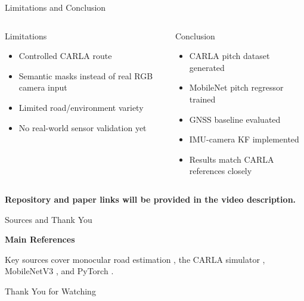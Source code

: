 \documentclass[aspectratio=169,11pt]{beamer}
\begin{document}
\begin{frame}{Limitations and Conclusion}
\begin{columns}[T,onlytextwidth]
\begin{block}{Limitations}
\begin{itemize}
    \item Controlled CARLA route
    \item Semantic masks instead of real RGB camera input
    \item Limited road/environment variety
    \item No real-world sensor validation yet
\end{itemize}
\end{block}

\begin{block}{Conclusion}
\begin{itemize}
    \item CARLA pitch dataset generated
    \item MobileNet pitch regressor trained
    \item GNSS baseline evaluated
    \item IMU-camera KF implemented
    \item Results match CARLA references closely
\end{itemize}
\end{block}
\end{columns}
\vspace{0.5em}
\centering
\textbf{Repository and paper links will be provided in the video description.}
\end{frame}

\begin{frame}{Sources and Thank You}

\scriptsize

\textbf{Main References}

\vspace{0.3cm}

Key sources cover monocular road estimation \cite{ustunel2023iterative}, the CARLA simulator \cite{dosovitskiy2017carla}, MobileNetV3 \cite{howard2019mobilenetv3}, and PyTorch \cite{paszke2019pytorch}.

\vspace{0.2cm}




\vfill

\centering
{\Large Thank You for Watching}


\end{frame}
\end{document}
